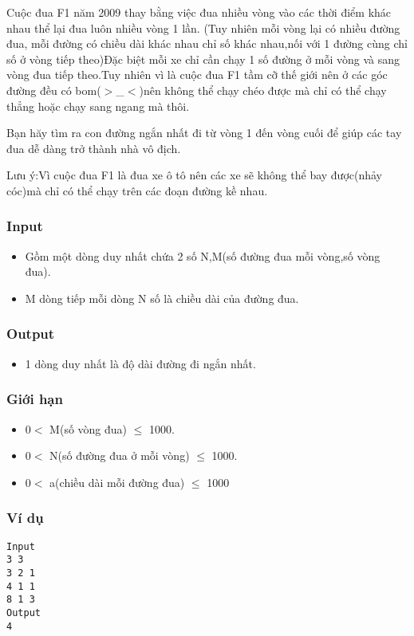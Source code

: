 



   Cuộc đua F1 năm 2009 thay bằng việc đua nhiều vòng vào các thời điểm khác nhau thể lại đua luôn nhiều vòng 1 lần. (Tuy nhiên mỗi vòng lại có nhiều đường đua, mỗi đường có chiều dài khác nhau chỉ số khác nhau,nối với 1 đường cùng chỉ số ở vòng tiếp theo)Đặc biệt mỗi xe chỉ cần chạy 1 số đường ở mỗi vòng và sang vòng đua tiếp theo.Tuy nhiên vì là cuộc đua F1 tầm cỡ thế giới nên ở các góc đường đều có bom($>$\_$<$)nên không thể chạy chéo được mà chỉ có thể chạy thẳng hoặc chạy sang ngang mà thôi.  

   Bạn hăy tìm ra con đường ngắn nhất đi từ vòng 1 đến vòng cuối để giúp các tay đua dễ dàng trở thành nhà vô địch.  

   Lưu ý:Vì cuộc đua F1 là đua xe ô tô nên các xe sẽ không thể bay được(nhảy cóc)mà chỉ có thể chạy trên các đoạn đường kề nhau.  

\subsubsection{   Input  }
\begin{itemize}
	\item     Gồm một dòng duy nhất chứa 2 số N,M(số đường đua mỗi vòng,số vòng đua).   
	\item     M dòng tiếp mỗi dòng N số là chiều dài của đường đua.   
\end{itemize}

\subsubsection{   Output  }
\begin{itemize}
	\item     1 dòng duy nhất là độ dài đường đi ngắn nhất.   
\end{itemize}

\subsubsection{   Giới hạn  }
\begin{itemize}
	\item     0$<$ M(số vòng đua)  $\le$ 1000.   
	\item     0$<$ N(số đường đua ở mỗi vòng) $\le$ 1000.   
	\item     0$<$ a(chiều dài mỗi đường đua) $\le$ 1000   
\end{itemize}

\subsubsection{   Ví dụ  }
\begin{verbatim}
Input
3 3
3 2 1
4 1 1
8 1 3
Output
4
\end{verbatim}
